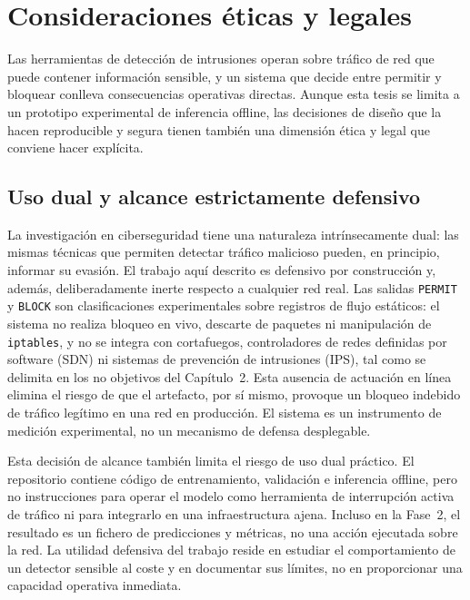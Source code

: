 \chapter{Consideraciones éticas y legales}

Las herramientas de detección de intrusiones operan sobre tráfico de red que puede contener información sensible, y un sistema que decide entre permitir y bloquear conlleva consecuencias operativas directas. Aunque esta tesis se limita a un prototipo experimental de inferencia offline, las decisiones de diseño que la hacen reproducible y segura tienen también una dimensión ética y legal que conviene hacer explícita.

\section{Uso dual y alcance estrictamente defensivo}
La investigación en ciberseguridad tiene una naturaleza intrínsecamente dual: las mismas técnicas que permiten detectar tráfico malicioso pueden, en principio, informar su evasión. El trabajo aquí descrito es defensivo por construcción y, además, deliberadamente inerte respecto a cualquier red real. Las salidas \texttt{PERMIT} y \texttt{BLOCK} son clasificaciones experimentales sobre registros de flujo estáticos: el sistema no realiza bloqueo en vivo, descarte de paquetes ni manipulación de \texttt{iptables}, y no se integra con cortafuegos, controladores de redes definidas por software (SDN) ni sistemas de prevención de intrusiones (IPS), tal como se delimita en los no objetivos del Capítulo~2. Esta ausencia de actuación en línea elimina el riesgo de que el artefacto, por sí mismo, provoque un bloqueo indebido de tráfico legítimo en una red en producción. El sistema es un instrumento de medición experimental, no un mecanismo de defensa desplegable.

Esta decisión de alcance también limita el riesgo de uso dual práctico. El repositorio contiene código de entrenamiento, validación e inferencia offline, pero no instrucciones para operar el modelo como herramienta de interrupción activa de tráfico ni para integrarlo en una infraestructura ajena. Incluso en la Fase~2, el resultado es un fichero de predicciones y métricas, no una acción ejecutada sobre la red. La utilidad defensiva del trabajo reside en estudiar el comportamiento de un detector sensible al coste y en documentar sus límites, no en proporcionar una capacidad operativa inmediata.

